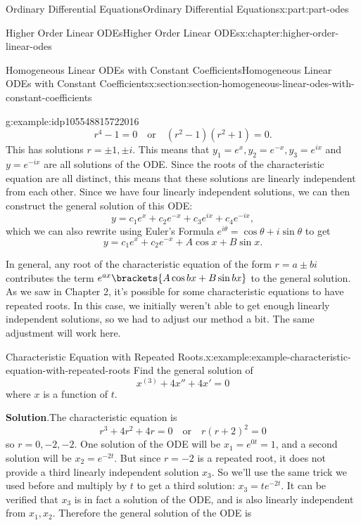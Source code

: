\documentclass[twoside,10pt,]{book}
\newcommand{\blocktitlefont}{\relax}
\numberwithin{equation}{part}
\begin{document}
\begin{partptx}{Ordinary Differential Equations}{}{Ordinary Differential Equations}{}{}{x:part:part-odes}
\begin{chapterptx}{Higher Order Linear ODEs}{}{Higher Order Linear ODEs}{}{}{x:chapter:higher-order-linear-odes}
\begin{sectionptx}{Homogeneous Linear ODEs with Constant Coefficients}{}{Homogeneous Linear ODEs with Constant Coefficients}{}{}{x:section:section-homogeneous-linear-odes-with-constant-coefficients}
\begin{example}{}{g:example:idp105548815722016}
\begin{equation*}
r^{4}-1=0\quad\text{or}\quad (r^{2}-1)(r^{2}+1)=0.
\end{equation*}
This has solutions \(r=\pm1,\pm i\). This means that \(y_{1} = e^{x},y_{2}=e^{-x},y_{3}=e^{ix}\) and \(y=e^{-ix}\) are all solutions of the ODE. Since the roots of the characteristic equation are all distinct, this means that these solutions are linearly independent from each other. Since we have four linearly independent solutions, we can then construct the general solution of this ODE:%
\begin{equation*}
y = c_{1}e^{x}+c_{2}e^{-x}+c_{3}e^{ix}+c_{4}e^{-ix},
\end{equation*}
which we can also rewrite using Euler's Formula \(e^{i\theta} = \cos\theta+i\sin\theta\) to get%
\begin{equation*}
y = c_{1}e^{x}+c_{2}e^{-x}+A\cos x+B\sin x.
\end{equation*}
%
\end{example}
In general, any root of the characteristic equation of the form \(r=a\pm bi\) contributes the term \(e^{ax}\brackets{A\cos bx+B\sin bx}\) to the general solution. As we saw in Chapter 2, it's possible for some characteristic equations to have repeated roots. In this case, we initially weren't able to get enough linearly independent solutions, so we had to adjust our method a bit. The same adjustment will work here.%
\begin{example}{Characteristic Equation with Repeated Roots.}{x:example:example-characteristic-equation-with-repeated-roots}%
Find the general solution of%
\begin{equation*}
x^{(3)}+4x''+4x'=0
\end{equation*}
where \(x\) is a function of \(t\).%
\par\smallskip%
\noindent\textbf{\blocktitlefont Solution}.\hypertarget{g:solution:idp105548815729824}{}\quad{}The characteristic equation is%
\begin{equation*}
r^{3}+4r^{2}+4r = 0\quad\text{or}\quad r(r+2)^{2}=0
\end{equation*}
so \(r=0,-2,-2\). One solution of the ODE will be \(x_{1} = e^{0t} = 1\), and a second solution will be \(x_{2} = e^{-2t}\). But since \(r=-2\) is a repeated root, it does not provide a third linearly independent solution \(x_{3}\). So we'll use the same trick we used before and multiply by \(t\) to get a third solution: \(x_{3} = te^{-2t}\). It can be verified that \(x_{3}\) is in fact a solution of the ODE, and is also linearly independent from \(x_{1},x_{2}\). Therefore the general solution of the ODE is%

\end{example}
\end{sectionptx}
\end{chapterptx}
\end{partptx}
\end{document}
